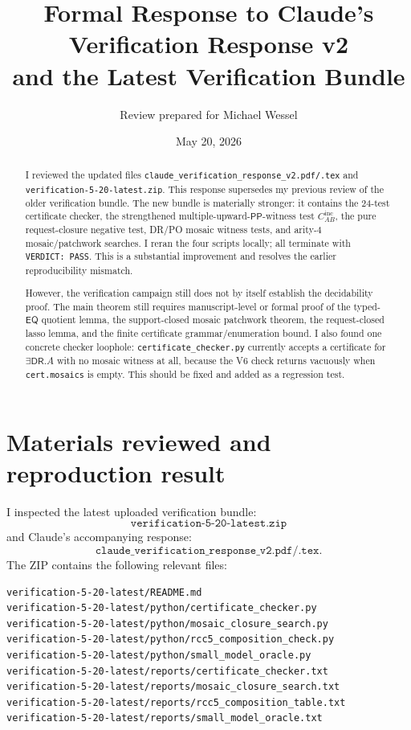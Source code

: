\documentclass[11pt]{article}
\title{Formal Response to Claude's Verification Response v2\\and the Latest Verification Bundle}
\author{Review prepared for Michael Wessel}
\date{May 20, 2026}
\newcommand{\PP}{\mathsf{PP}}
\newcommand{\DR}{\mathsf{DR}}
\newcommand{\EQ}{\mathsf{EQ}}
\begin{document}
\maketitle

\begin{abstract}
I reviewed the updated files \texttt{claude\_verification\_response\_v2.pdf/.tex} and
\texttt{verification-5-20-latest.zip}.  This response supersedes my previous review of
the older verification bundle.  The new bundle is materially stronger: it contains the
24-test certificate checker, the strengthened multiple-upward-\(\PP\)-witness test
\(C_{AB}^{\mathrm{inc}}\), the pure request-closure negative test, DR/PO mosaic witness tests,
and arity-4 mosaic/patchwork searches.  I reran the four scripts locally; all terminate
with \texttt{VERDICT: PASS}.  This is a substantial improvement and resolves the earlier
reproducibility mismatch.

However, the verification campaign still does not by itself establish the decidability
proof.  The main theorem still requires manuscript-level or formal proof of the typed-\(\EQ\)
quotient lemma, the support-closed mosaic patchwork theorem, the request-closed lasso
lemma, and the finite certificate grammar/enumeration bound.  I also found one concrete
checker loophole: \texttt{certificate\_checker.py} currently accepts a certificate for
\(\exists \DR.A\) with no mosaic witness at all, because the V6 check returns vacuously when
\texttt{cert.mosaics} is empty.  This should be fixed and added as a regression test.
\end{abstract}

\section{Materials reviewed and reproduction result}

I inspected the latest uploaded verification bundle:
\[
\texttt{verification-5-20-latest.zip}
\]
and Claude's accompanying response:
\[
\texttt{claude\_verification\_response\_v2.pdf/.tex}.
\]
The ZIP contains the following relevant files:
\begin{verbatim}
verification-5-20-latest/README.md
verification-5-20-latest/python/certificate_checker.py
verification-5-20-latest/python/mosaic_closure_search.py
verification-5-20-latest/python/rcc5_composition_check.py
verification-5-20-latest/python/small_model_oracle.py
verification-5-20-latest/reports/certificate_checker.txt
verification-5-20-latest/reports/mosaic_closure_search.txt
verification-5-20-latest/reports/rcc5_composition_table.txt
verification-5-20-latest/reports/small_model_oracle.txt
\end{verbatim}
\end{document}
